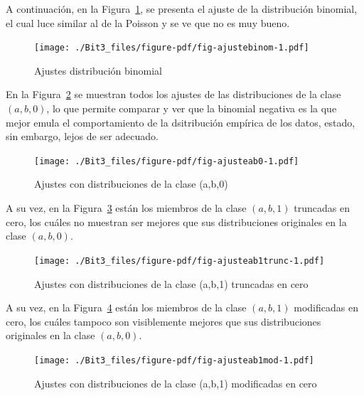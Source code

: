 \documentclass[
  letterpaper,
  onepage,
  openany]{scrreprt}
\begin{document}
A continuación, en la Figura~\ref{fig-ajustebinom}, se presenta el
ajuste de la distribución binomial, el cual luce similar al de la
Poisson y se ve que no es muy bueno.

\begin{figure}[H]

\caption{\label{fig-ajustebinom}Ajustes distribución binomial}

{\centering \texttt{[image: ./Bit3\_files/figure-pdf/fig-ajustebinom-1.pdf]}

}

\end{figure}

En la Figura~\ref{fig-ajusteab0} se muestran todos los ajustes de las
distribuciones de la clase \((a,b,0)\), lo que permite comparar y ver
que la binomial negativa es la que mejor emula el comportamiento de la
dsitribución empírica de los datos, estado, sin embargo, lejos de ser
adecuado.

\begin{figure}[H]

\caption{\label{fig-ajusteab0}Ajustes con distribuciones de la clase
(a,b,0)}

{\centering \texttt{[image: ./Bit3\_files/figure-pdf/fig-ajusteab0-1.pdf]}

}

\end{figure}

A su vez, en la Figura~\ref{fig-ajusteab1trunc} están los miembros de la
clase \((a,b,1)\) truncadas en cero, los cuáles no muestran ser mejores
que sus distribuciones originales en la clase \((a,b,0)\).

\begin{figure}[H]

\caption{\label{fig-ajusteab1trunc}Ajustes con distribuciones de la
clase (a,b,1) truncadas en cero}

{\centering \texttt{[image: ./Bit3\_files/figure-pdf/fig-ajusteab1trunc-1.pdf]}

}

\end{figure}

A su vez, en la Figura~\ref{fig-ajusteab1mod} están los miembros de la
clase \((a,b,1)\) modificadas en cero, los cuáles tampoco son
visiblemente mejores que sus distribuciones originales en la clase
\((a,b,0)\).

\begin{figure}[H]

\caption{\label{fig-ajusteab1mod}Ajustes con distribuciones de la clase
(a,b,1) modificadas en cero}

{\centering \texttt{[image: ./Bit3\_files/figure-pdf/fig-ajusteab1mod-1.pdf]}

}

\end{figure}
\end{document}

